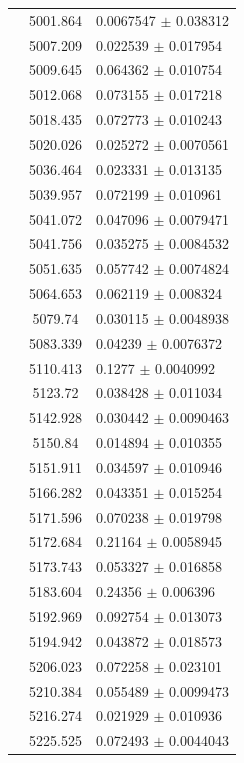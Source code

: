 \begin{longtable}{|c|c|l|}
 & 5001.864 & 0.0067547 $\pm$ 0.038312 \\       
 & 5007.209 & 0.022539 $\pm$ 0.017954 \\        
 & 5009.645 & 0.064362 $\pm$ 0.010754 \\        
 & 5012.068 & 0.073155 $\pm$ 0.017218 \\        
 & 5018.435 & 0.072773 $\pm$ 0.010243 \\        
 & 5020.026 & 0.025272 $\pm$ 0.0070561 \\       
 & 5036.464 & 0.023331 $\pm$ 0.013135 \\        
 & 5039.957 & 0.072199 $\pm$ 0.010961 \\        
 & 5041.072 & 0.047096 $\pm$ 0.0079471 \\       
 & 5041.756 & 0.035275 $\pm$ 0.0084532 \\       
 & 5051.635 & 0.057742 $\pm$ 0.0074824 \\       
 & 5064.653 & 0.062119 $\pm$ 0.008324 \\        
 & 5079.74 & 0.030115 $\pm$ 0.0048938 \\        
 & 5083.339 & 0.04239 $\pm$ 0.0076372 \\        
 & 5110.413 & 0.1277 $\pm$ 0.0040992 \\         
 & 5123.72 & 0.038428 $\pm$ 0.011034 \\         
 & 5142.928 & 0.030442 $\pm$ 0.0090463 \\       
 & 5150.84 & 0.014894 $\pm$ 0.010355 \\         
 & 5151.911 & 0.034597 $\pm$ 0.010946 \\        
 & 5166.282 & 0.043351 $\pm$ 0.015254 \\        
 & 5171.596 & 0.070238 $\pm$ 0.019798 \\        
 & 5172.684 & 0.21164 $\pm$ 0.0058945 \\        
 & 5173.743 & 0.053327 $\pm$ 0.016858 \\        
 & 5183.604 & 0.24356 $\pm$ 0.006396 \\         
 & 5192.969 & 0.092754 $\pm$ 0.013073 \\        
 & 5194.942 & 0.043872 $\pm$ 0.018573 \\        
 & 5206.023 & 0.072258 $\pm$ 0.023101 \\        
 & 5210.384 & 0.055489 $\pm$ 0.0099473 \\       
 & 5216.274 & 0.021929 $\pm$ 0.010936 \\        
 & 5225.525 & 0.072493 $\pm$ 0.0044043 \\       

\end{longtable}
